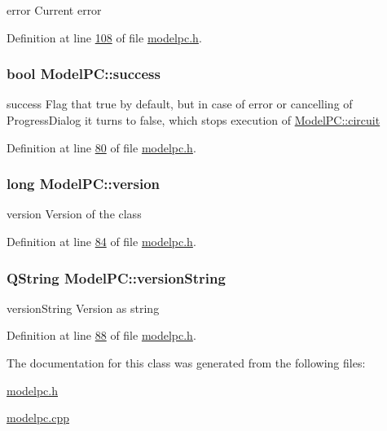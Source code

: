 error Current error 



Definition at line \hyperlink{modelpc_8h_source_l00108}{108} of file \hyperlink{modelpc_8h_source}{modelpc.\+h}.

\subsubsection[{\texorpdfstring{success}{success}}]{\setlength{\rightskip}{0pt plus 5cm}bool Model\+P\+C\+::success}\hypertarget{class_model_p_c_a945ffbbc44a832b953c191debd448f4c}{}\label{class_model_p_c_a945ffbbc44a832b953c191debd448f4c}


success Flag that true by default, but in case of error or cancelling of Progress\+Dialog it turns to false, which stops execution of \hyperlink{class_model_p_c_a1d0091062a0c836b283ec2f67411623b}{Model\+P\+C\+::circuit} 



Definition at line \hyperlink{modelpc_8h_source_l00080}{80} of file \hyperlink{modelpc_8h_source}{modelpc.\+h}.

\subsubsection[{\texorpdfstring{version}{version}}]{\setlength{\rightskip}{0pt plus 5cm}long Model\+P\+C\+::version}\hypertarget{class_model_p_c_a5af48ab89e19be42a94c34ba00249401}{}\label{class_model_p_c_a5af48ab89e19be42a94c34ba00249401}


version Version of the class 



Definition at line \hyperlink{modelpc_8h_source_l00084}{84} of file \hyperlink{modelpc_8h_source}{modelpc.\+h}.

\subsubsection[{\texorpdfstring{version\+String}{versionString}}]{\setlength{\rightskip}{0pt plus 5cm}Q\+String Model\+P\+C\+::version\+String}\hypertarget{class_model_p_c_a5f426725ccf7eefd3c77ea8c720264c9}{}\label{class_model_p_c_a5f426725ccf7eefd3c77ea8c720264c9}


version\+String Version as string 



Definition at line \hyperlink{modelpc_8h_source_l00088}{88} of file \hyperlink{modelpc_8h_source}{modelpc.\+h}.



The documentation for this class was generated from the following files\+:\begin{DoxyCompactItemize}
\item 
\hyperlink{modelpc_8h}{modelpc.\+h}\item 
\hyperlink{modelpc_8cpp}{modelpc.\+cpp}\end{DoxyCompactItemize}
